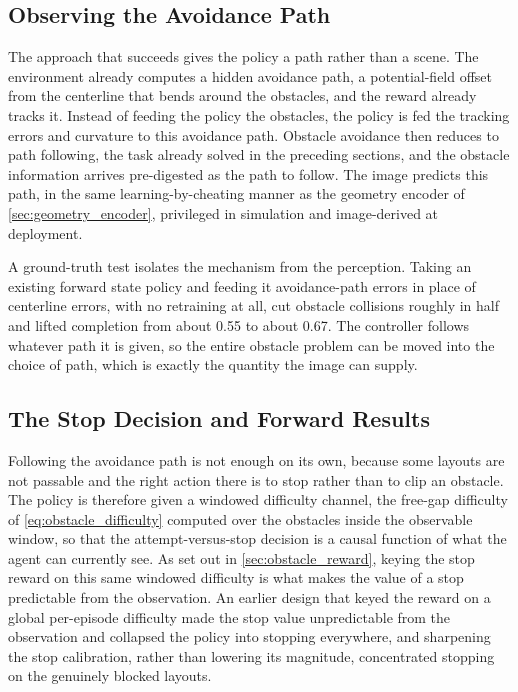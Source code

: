 \subsection{Observing the Avoidance Path}

The approach that succeeds gives the policy a path rather than a scene. The environment already computes a hidden avoidance path, a potential-field offset from the centerline that bends around the obstacles, and the reward already tracks it. Instead of feeding the policy the obstacles, the policy is fed the tracking errors and curvature to this avoidance path. Obstacle avoidance then reduces to path following, the task already solved in the preceding sections, and the obstacle information arrives pre-digested as the path to follow. The image predicts this path, in the same learning-by-cheating manner as the geometry encoder of \cref{sec:geometry_encoder}, privileged in simulation and image-derived at deployment.

A ground-truth test isolates the mechanism from the perception. Taking an existing forward state policy and feeding it avoidance-path errors in place of centerline errors, with no retraining at all, cut obstacle collisions roughly in half and lifted completion from about 0.55 to about 0.67. The controller follows whatever path it is given, so the entire obstacle problem can be moved into the choice of path, which is exactly the quantity the image can supply.

\subsection{The Stop Decision and Forward Results}

Following the avoidance path is not enough on its own, because some layouts are not passable and the right action there is to stop rather than to clip an obstacle. The policy is therefore given a windowed difficulty channel, the free-gap difficulty of \cref{eq:obstacle_difficulty} computed over the obstacles inside the observable window, so that the attempt-versus-stop decision is a causal function of what the agent can currently see. As set out in \cref{sec:obstacle_reward}, keying the stop reward on this same windowed difficulty is what makes the value of a stop predictable from the observation. An earlier design that keyed the reward on a global per-episode difficulty made the stop value unpredictable from the observation and collapsed the policy into stopping everywhere, and sharpening the stop calibration, rather than lowering its magnitude, concentrated stopping on the genuinely blocked layouts.

